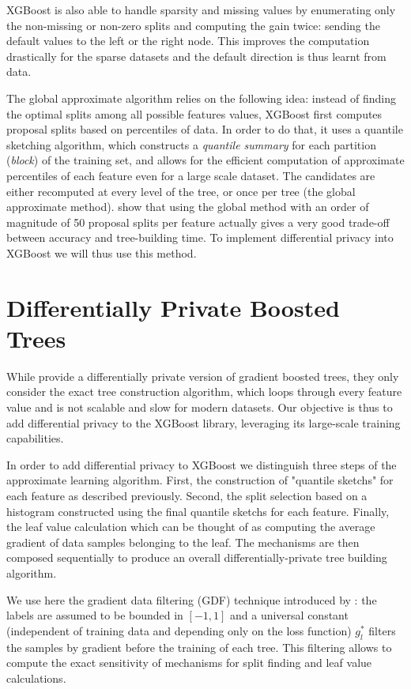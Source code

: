 \documentclass{article}
\theoremstyle{definition}
\begin{document}
XGBoost is also able to handle sparsity and missing values by enumerating only the non-missing or non-zero splits and computing the gain twice:
sending the default values to the left or the right node. This improves the computation drastically for the sparse datasets and the default direction is thus learnt from data.

The global approximate algorithm relies on the following idea: instead of finding the optimal splits among all possible features values,
XGBoost first computes proposal splits based on percentiles of data. In order to do that, it uses a quantile sketching algorithm, which constructs a \textit{quantile summary} 
for each partition (\textit{block}) of the training set, and allows for the efficient computation of approximate percentiles of each feature even for a large scale dataset.
The candidates are either recomputed at every level of the tree, or once per tree (the global approximate method).
\cite{chen2016xgboost} show that using the global method with an order of magnitude of 50 proposal splits per feature actually gives a very good trade-off between accuracy and tree-building time.
To implement differential privacy into XGBoost we will thus use this method. 

\section{Differentially Private Boosted Trees} 

While \cite{li2020privacy} provide a differentially private version of gradient boosted trees, they only consider the exact tree construction algorithm,
which loops through every feature value and is not scalable and slow for modern datasets. Our objective is thus to add differential privacy to the XGBoost library,
leveraging its large-scale training capabilities. 

In order to add differential privacy to XGBoost we distinguish three steps of the approximate learning algorithm. First, the 
construction of "quantile sketchs" for each feature as described previously. Second, the split selection based on a histogram
constructed using the final quantile sketchs for each feature. Finally, the leaf value calculation which can be thought of as computing
the average gradient of data samples belonging to the leaf. The mechanisms are then composed sequentially to produce an overall differentially-private tree building algorithm.

We use here the gradient data filtering (GDF) technique introduced by \cite{li2020privacy}:
the labels are assumed to be bounded in $[-1,1]$ and a universal constant (independent of training data and depending only on the loss function)
$g_l^{*}$ filters the samples by gradient before the training of each tree.
This filtering allows to compute the exact sensitivity of mechanisms for split finding and leaf value calculations.
\end{document}
